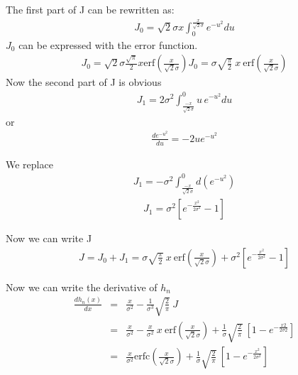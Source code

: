 The first part of J can be rewritten as:
\begin{eqnarray}
 J_{0} = \sqrt{2}\sigma x \int_{0}^{\frac{x}{\sqrt{2}\sigma} } 
 e^{-u^{2}} du  
\end{eqnarray}
$ J_{0} $ can be expressed with the error function.
\begin{eqnarray}
 J_{0} = \sqrt{2}\sigma \frac{\sqrt{\pi}}{2} x  \mbox{erf}(\frac{x}{\sqrt{2}\sigma}) 
 J_{0} = \sigma \sqrt{\frac{\pi}{2}} \: x \:  \mbox{erf}(\frac{x}{\sqrt{2}\sigma}) 
\end{eqnarray}
Now the second part of J is obvious
\begin{eqnarray}
 J_{1} = 2 \sigma^{2} \int_{\frac{-x}{\sqrt{2}\sigma} }^{0} u \,
 e^{-u^{2}} du  
\end{eqnarray}
 or
\begin{eqnarray}
\frac{d e^{-u^{2}}} {du} = -2 u e^{-u^{2}} 
\end{eqnarray}

We replace
\begin{eqnarray}
 J_{1} = -\sigma^{2}  \int_{\frac{-x}{\sqrt{2}\sigma} }^{0} d(e^{-u^{2}})  
\end{eqnarray}
\begin{eqnarray}
 J_{1} = \sigma^{2}  [e^{-\frac{x^{2}}{2\sigma^{2}}} - 1]  
\end{eqnarray}

Now we can write J
\begin{eqnarray}
 J = J_{0} + J_{1}
  = \sigma \sqrt{\frac{\pi}{2}} \: x \:  \mbox{erf}(\frac{x}{\sqrt{2}\sigma}) 
    + \sigma^{2}  [e^{-\frac{x^{2}}{2\sigma^{2}}} - 1 ]  
\end{eqnarray}

Now we can write the derivative of $h_n$
\begin{eqnarray}
\frac{d h_{n}(x)}{dx} & = & 
\frac{x}{\sigma^{2}}   -
\frac{1}{\sigma^{3}} \sqrt{\frac{2}{\pi} } \: J \\
                   & = &   \frac{x}{\sigma^{2}} -
  \frac{x}{\sigma^{2}}\: x \:  \mbox{erf}(\frac{x}{\sqrt{2}\sigma})
  + \frac{1}{\sigma} \sqrt{\frac{2}{\pi} } \:
      [1 - e^{-\frac{x{2}}{2\sigma{2}}}]  \\
                    & = &  \frac{x}{\sigma^{2}}\mbox{erfc}(\frac{x}{\sqrt{2}\sigma})
    + \frac{1}{\sigma} \sqrt{\frac{2}{\pi} } \:
      [1 - e^{-\frac{x^{2}}{2\sigma^{2}}}] 
\end{eqnarray}

